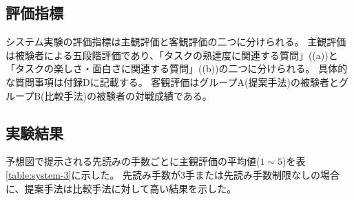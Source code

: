 \subsection{評価指標}
システム実験の評価指標は主観評価と客観評価の二つに分けられる。
主観評価は被験者による五段階評価であり、「タスクの熟達度に関連する質問」((a))と「タスクの楽しさ・面白さに関連する質問」((b))の二つに分けられる。
具体的な質問事項は付録Dに記載する。
客観評価はグループA(提案手法)の被験者とグループB(比較手法)の被験者の対戦成績である。

\subsection{実験結果}
予想図で提示される先読みの手数ごとに主観評価の平均値($1\sim5$)を表\ref{table:system-3}に示した。
先読み手数が3手または先読み手数制限なしの場合に、提案手法は比較手法に対して高い結果を示した。
\begin{table}[H]
    \caption{先読み手数３手の場合}
    \scriptsize
    \centering
    \label{table:system-3}
\end{table}
